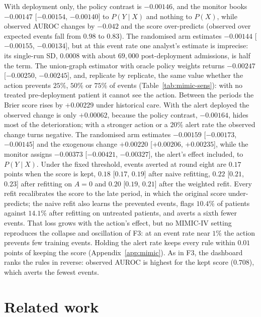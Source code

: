 \documentclass[letterpaper]{article} %
\begin{document}
With deployment only, the policy contrast is $-0.00146$, and the monitor books
$-0.00147$ [$-0.00154$, $-0.00140$] to $P(Y \mid X)$ and nothing to $P(X)$,
while observed AUROC changes by $-0.042$ and the score over-predicts (observed
over expected events fall from $0.98$ to $0.83$). The randomised arm estimates
$-0.00144$ [$-0.00155$, $-0.00134$], but at this event rate one analyst's
estimate is imprecise: its single-run SD, $0.0008$ with about $69{,}000$
post-deployment admissions, is half the term. The union-graph estimator with
oracle policy weights returns $-0.00247$ [$-0.00250$, $-0.00245$], and,
replicate by replicate, the same value whether the action prevents $25\%$,
$50\%$ or $75\%$ of events (Table~\ref{tab:mimic-sens}): with no treated
pre-deployment patient it cannot see the action. Between the periods the
Brier score rises by $+0.00229$ under historical care. With the alert deployed
the observed change is only $+0.00062$, because the policy contrast,
$-0.00164$, hides most of the deterioration; with a stronger action or a
$20\%$ alert rate the observed change turns negative. The randomised arm
estimates $-0.00159$ [$-0.00173$, $-0.00145$] and the exogenous change
$+0.00220$ [$+0.00206$, $+0.00235$], while the monitor assigns
$-0.00373$ [$-0.00421$, $-0.00327$], the alert's effect included, to
$P(Y \mid X)$.
Under the fixed threshold, events averted at round eight are $0.17$ points
when the score is kept, $0.18$ [$0.17$, $0.19$] after naive refitting,
$0.22$ [$0.21$, $0.23$] after refitting on $A=0$ and $0.20$ [$0.19$, $0.21$] after
the weighted refit. Every refit recalibrates the score to the late period, in
which the original score under-predicts; the naive refit also learns the
prevented events, flags $10.4\%$ of patients against $14.1\%$ after
refitting on untreated patients, and averts a sixth fewer events. That loss
grows with the action's effect, but no MIMIC-IV setting reproduces the
collapse and oscillation of F3: at an event rate near $1\%$ the action
prevents few training events. Holding the alert rate keeps every rule within
$0.01$ points of keeping the score (Appendix~\ref{app:mimic}). As in F3, the
dashboard ranks the rules in reverse: observed AUROC is highest for the kept
score ($0.708$), which averts the fewest events.


\section{Related work}
\label{sec:related}
\end{document}
